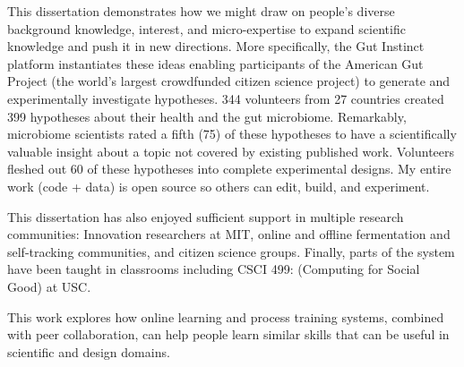 This dissertation demonstrates how we might draw on people’s diverse background knowledge, interest, and micro-expertise to expand scientific knowledge and push it in new directions. More specifically, the Gut Instinct platform instantiates these ideas enabling participants of the American Gut Project (the world’s largest crowdfunded citizen science project) to generate and experimentally investigate hypotheses. 344 volunteers from 27 countries created 399 hypotheses about their health and the gut microbiome. Remarkably, microbiome scientists rated a fifth (75) of these hypotheses to have a scientifically valuable insight about a topic not covered by existing published work. Volunteers fleshed out 60 of these hypotheses into complete experimental designs. My entire work (code + data) is open source so others can edit, build, and experiment.

This dissertation has also enjoyed sufficient support in multiple research communities: Innovation researchers at MIT, online and offline fermentation and self-tracking communities, and citizen science groups. Finally, parts of the system have been taught in classrooms including CSCI 499: (Computing for Social Good) at USC. 

This work explores how online learning and process training systems, combined with
peer collaboration, can help people learn similar skills that
can be useful in scientific and design domains.











